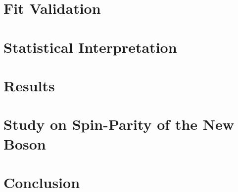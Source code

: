\documentclass[12pt,chapterheads]{ucsd}
\begin{document}
%
\chapter{Fit Validation}
\label{ch:fit_validation}


%
\chapter{Statistical Interpretation}
\label{ch:stat_interpret}


%
\chapter{Results}
\label{ch:results}


%
\chapter{Study on Spin-Parity of the New Boson}
\label{ch:spin}


%
\chapter{Conclusion}
\label{ch:conclusion}


% 
\newpage



\appendix

%
%

%
%



 \printindex %
\end{document}
